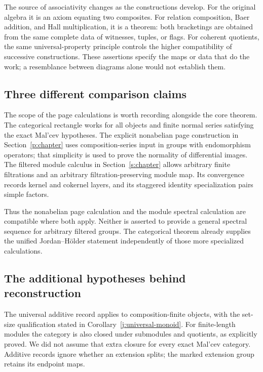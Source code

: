 The source of associativity changes as the constructions develop. For the
original algebra it is an axiom equating two composites. For relation
composition, Baer addition, and Hall multiplication, it is a theorem:
both bracketings are obtained from the same complete data of witnesses,
tuples, or flags. For coherent quotients, the same universal-property
principle controls the higher compatibility of successive constructions.
These assertions specify the maps or data that do the work; a resemblance
between diagrams alone would not establish them.

\subsection{Three different comparison claims}

The scope of the page calculations is worth recording alongside the core
theorem. The categorical rectangle works for all objects and finite normal
series satisfying the exact Mal'cev hypotheses. The explicit nonabelian
page construction in Section~\ref{p:chapter} uses composition-series
input in groups with endomorphism operators; that simplicity is used to
prove the normality of differential images. The filtered module calculus
in Section~\ref{s:chapter} allows arbitrary finite filtrations and an
arbitrary filtration-preserving module map. Its convergence records
kernel and cokernel layers, and its staggered identity specialization
pairs simple factors.

Thus the nonabelian page calculation and the module spectral calculation
are compatible where both apply. Neither is asserted to provide a general
spectral sequence for arbitrary filtered groups. The categorical theorem
already supplies the unified Jordan--H\"older statement independently of
those more specialized calculations.

\subsection{The additional hypotheses behind reconstruction}

The universal additive record applies to composition-finite objects, with
the set-size qualification stated in Corollary~\ref{j:universal-monoid}.
For finite-length modules the category is also closed under submodules
and quotients, as explicitly proved. We did not assume that extra closure
for every exact Mal'cev category. Additive records ignore whether an
extension splits; the marked extension group retains its endpoint maps.

